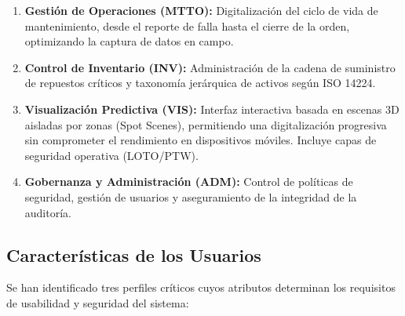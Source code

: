 \begin{enumerate}
    \item \textbf{Gestión de Operaciones (MTTO):} Digitalización del ciclo de vida de mantenimiento, desde el reporte de falla hasta el cierre de la orden, optimizando la captura de datos en campo.
    \item \textbf{Control de Inventario (INV):} Administración de la cadena de suministro de repuestos críticos y taxonomía jerárquica de activos según ISO 14224.
    \item \textbf{Visualización Predictiva (VIS):} Interfaz interactiva basada en escenas 3D aisladas por zonas (Spot Scenes), permitiendo una digitalización progresiva sin comprometer el rendimiento en dispositivos móviles. Incluye capas de seguridad operativa (LOTO/PTW).
    \item \textbf{Gobernanza y Administración (ADM):} Control de políticas de seguridad, gestión de usuarios y aseguramiento de la integridad de la auditoría.
\end{enumerate}
\subsection{Características de los Usuarios}
Se han identificado tres perfiles críticos cuyos atributos determinan los requisitos de usabilidad y seguridad del sistema:

